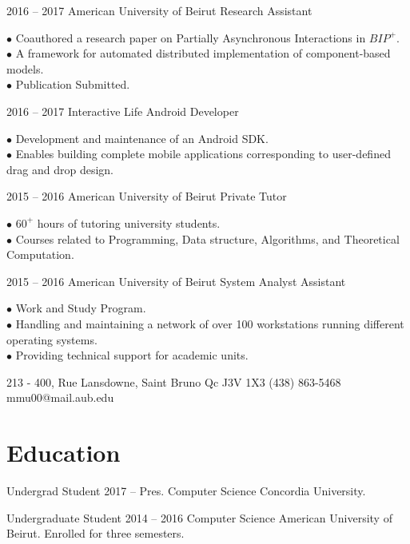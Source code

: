 \documentclass{tccv}
\begin{document}
\begin{eventlist}

\item{2016 -- 2017}
     {American University of Beirut}
     {Research Assistant}

$\bullet$ Coauthored a research paper on Partially Asynchronous Interactions in $BIP^+$.\\
$\bullet$ A framework for automated distributed implementation of component-based models. \\
$\bullet$ Publication Submitted.

\item{2016 -- 2017}
     {Interactive Life}
     {Android Developer}

$\bullet$ Development and maintenance of an Android SDK.\\
$\bullet$ Enables building complete mobile applications corresponding to user-defined drag and drop design.

\item{2015 -- 2016}
     {American University of Beirut}
     {Private Tutor}

$\bullet$ $60^+$ hours of tutoring university students.\\
$\bullet$ Courses related to Programming, Data structure, Algorithms, and Theoretical Computation.

\item{2015 -- 2016}
     {American University of Beirut}
     {System Analyst Assistant}

$\bullet$ Work and Study Program.\\
$\bullet$ Handling and maintaining a network of over 100 workstations running different operating systems. \\
$\bullet$ Providing technical support for academic units.


\end{eventlist}



\personal
    {213 - 400,  Rue Lansdowne, Saint Bruno \hspace{1cm} Qc J3V 1X3}
    {(438) 863-5468}
    {mmu00@mail.aub.edu}

\section{Education}

\begin{yearlist}

\item[Undergrad Student]{2017 -- Pres.}
     {Computer Science } 
     {Concordia University.}

\item[Undergraduate Student]{2014 -- 2016}
     {Computer Science} 
     {American University of Beirut. Enrolled for three semesters.}



\end{yearlist}
\end{document}
